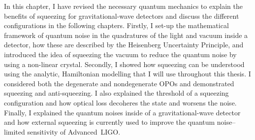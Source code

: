 In this chapter, I have revised the necessary quantum mechanics to explain the benefits of squeezing for gravitational-wave detectors and discuss the different configurations in the following chapters.
Firstly, I set-up the mathematical framework of quantum noise in the quadratures of the light and vacuum inside a detector, how these are described by the Heisenberg Uncertainty Principle, and introduced the idea of squeezing the vacuum to reduce the quantum noise by using a non-linear crystal.  %
Secondly, I showed how squeezing can be understood using the analytic, Hamiltonian modelling that I will use throughout this thesis. I considered both the degenerate and nondegenerate OPOs and demonstrated squeezing and anti-squeezing. I also explained the threshold of a squeezing configuration and how optical loss decoheres the state and worsens the noise. %
Finally, I explained the quantum noises inside of a gravitational-wave detector and how external squeezing is currently used to improve the quantum noise--limited sensitivity of Advanced~LIGO. %


